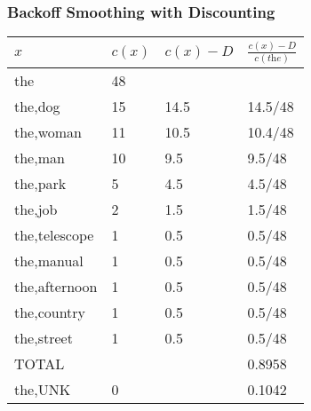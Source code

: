 \begin{frame}
\frametitle{Backoff Smoothing with Discounting}
\begin{center}
\begin{tabular}{ | l | l | l | l | }
\hline
$x$ & $c(x)$ & $c(x)-D$ & $\frac{c(x)-D}{c(\textit{the})}$ \\
\hline
the & 48 & & \\
the,dog & 15 & 14.5 & 14.5/48 \\
the,woman & 11 & 10.5 & 10.4/48 \\
the,man & 10 & 9.5 & 9.5/48 \\
the,park & 5 & 4.5 & 4.5/48 \\
the,job & 2 & 1.5 & 1.5/48 \\
the,telescope & 1 & 0.5 & 0.5/48 \\
the,manual & 1 & 0.5 & 0.5/48 \\
the,afternoon & 1 & 0.5 & 0.5/48 \\
the,country & 1 & 0.5 & 0.5/48 \\
the,street & 1 & 0.5 & 0.5/48 \\
\hline
TOTAL & & & 0.8958 \\
\hline
the,UNK & 0 & & 0.1042 \\
\hline
\end{tabular}
\end{center}
\end{frame}


\begin{comment}
\begin{frame}
\frametitle{Backoff Smoothing with Discounting}
\begin{itemize}[<+->]
\item Kneser-Ney smoothing \\
$P(\textsf{Francisco}~\mid~\textsf{eggplant}) > P(\textsf{stew}~\mid~\textsf{eggplant})$
\begin{itemize}[<+->]
\item {\em Francisco} is common, so interpolation gives $P(\textsf{Francisco}~\mid~\textsf{eggplant})$ a high value
\item But {\em Francisco} occurs in few contexts (only after {\em San})
\item {\em stew} is common, {\bf and} occurs in many contexts
\item Hence weight the interpolation based on number of contexts for the word using discounting
\end{itemize}
\end{itemize}
\end{frame}

\end{comment}

